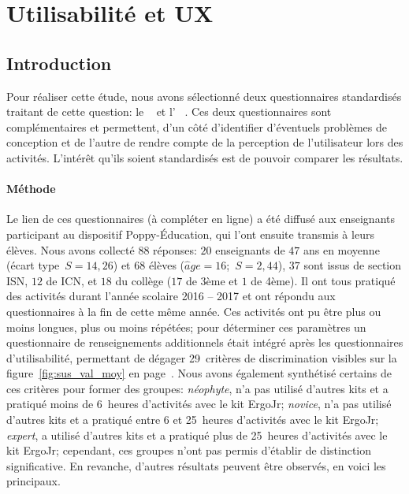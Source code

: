 \section{Utilisabilité et UX}\label{Exp:L_UX}
    \subsection{Introduction}
        Pour réaliser cette étude, nous avons sélectionné deux questionnaires standardisés traitant de cette question: le ~ et l' ~.
        Ces deux questionnaires sont complémentaires et permettent, d'un côté d'identifier d'éventuels problèmes de conception et de l'autre de rendre compte de la perception de l'utilisateur lors des activités.
        L’intérêt qu'ils soient standardisés est de pouvoir comparer les résultats.
    \paragraph{Méthode} 
        Le lien de ces questionnaires (à compléter en ligne) a été diffusé aux enseignants participant au dispositif Poppy-Éducation, qui l'ont ensuite transmis à leurs élèves.
        Nous avons collecté $88$ réponses: $20$ enseignants de $47$ ans en moyenne (écart type~$S=14,26$) et $68$ élèves ($\hat{a}ge=16$;~$S=2,44$),  $37$ sont issus de section ISN, $12$ de ICN, et $18$ du collège ($17$ de 3ème et $1$ de 4ème).
        Il ont tous pratiqué des activités durant l'année scolaire 2016 -- 2017 et ont répondu aux questionnaires à la fin de cette même année.
        Ces activités ont pu être plus ou moins longues, plus ou moins répétées;
        pour déterminer ces paramètres un questionnaire de renseignements additionnels était intégré après les questionnaires d'utilisabilité, permettant de dégager 29~critères de discrimination visibles sur la figure~\ref{fig:sus_val_moy} en page~\pageref{fig:sus_val_moy}.
        Nous avons également synthétisé certains de ces critères pour former des groupes:
        \textit{néophyte}, n'a pas utilisé d'autres kits et a pratiqué moins de 6~heures d'activités avec le kit ErgoJr;
        \textit{novice}, n'a pas utilisé d'autres kits et a pratiqué entre 6 et 25~heures d'activités avec le kit ErgoJr;
        \textit{expert}, a utilisé d'autres kits et a pratiqué plus de 25~heures d'activités avec le kit ErgoJr;
        cependant, ces groupes n'ont pas permis d'établir de distinction significative.
        En revanche, d'autres résultats peuvent être observés, en voici les principaux.
